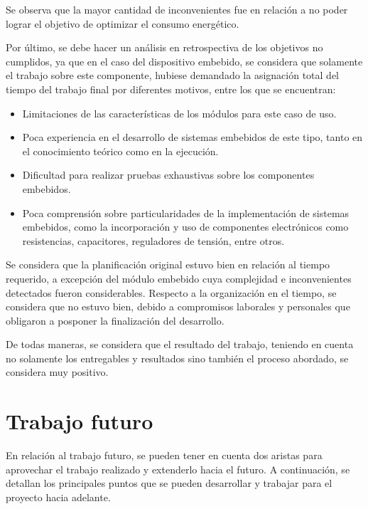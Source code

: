Se observa que la mayor cantidad de inconvenientes fue en relación a no poder lograr el objetivo de optimizar el consumo energético.

Por último, se debe hacer un análisis en retrospectiva de los objetivos no cumplidos, ya que en el caso del dispositivo embebido, se considera que solamente el trabajo sobre este componente, hubiese demandado la asignación total del tiempo del trabajo final por diferentes motivos, entre los que se encuentran:
\begin{itemize}
	\item Limitaciones de las características de los módulos para este caso de uso.
	\item Poca experiencia en el desarrollo de sistemas embebidos de este tipo, tanto en el conocimiento teórico como en la ejecución.
	\item Dificultad para realizar pruebas exhaustivas sobre los componentes embebidos.
	\item Poca comprensión sobre particularidades de la implementación de sistemas embebidos, como la incorporación y uso de componentes electrónicos como resistencias, capacitores, reguladores de tensión, entre otros.
\end{itemize}

Se considera que la planificación original estuvo bien en relación al tiempo requerido, a excepción del módulo embebido cuya complejidad e inconvenientes detectados fueron considerables. Respecto a la organización en el tiempo, se considera que no estuvo bien, debido a compromisos laborales y personales que obligaron a posponer la finalización del desarrollo.

De todas maneras, se considera que el resultado del trabajo, teniendo en cuenta no solamente los entregables y resultados sino también el proceso abordado, se considera muy positivo.

\section{Trabajo futuro}

En relación al trabajo futuro, se pueden tener en cuenta dos aristas para aprovechar el trabajo realizado y extenderlo hacia el futuro. A continuación, se detallan los principales puntos que se pueden desarrollar y trabajar para el proyecto hacia adelante.

